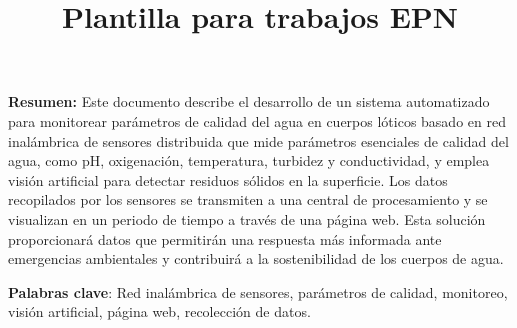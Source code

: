 \documentclass[12pt,a4paper]{book}
\title{Plantilla para trabajos EPN}
\renewcommand{\cleardoublepage}{\clearpage}
\begin{document}
\maketitlepage %
\newpage
\textbf{Resumen:}
Este documento describe el desarrollo de un sistema automatizado para monitorear parámetros de calidad del agua en cuerpos lóticos basado en red inalámbrica de sensores distribuida que mide parámetros esenciales de calidad del agua, como pH, oxigenación, temperatura, turbidez y conductividad, y emplea visión artificial para detectar residuos sólidos en la superficie. Los datos recopilados por los sensores se transmiten a una central de procesamiento y se visualizan en un periodo de tiempo a través de una página web. Esta solución proporcionará datos que permitirán una respuesta más informada ante emergencias ambientales y contribuirá a la sostenibilidad de los cuerpos de agua.

\textbf{Palabras clave}: Red inalámbrica de sensores, parámetros de calidad, monitoreo, visión artificial, página web, recolección de datos.
\newpage



\tableofcontents %
\listoffigures   %
\listoftables    %









%


%
%

\cleardoublepage
{}
{}
\printbibliography[title={Referencias}] %
\end{document}
